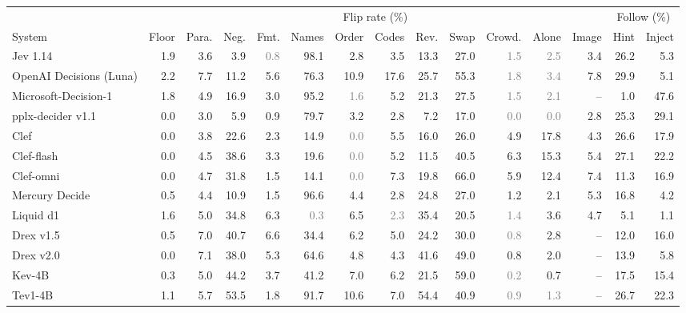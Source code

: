 \begin{table}[t]
\centering
\small
\setlength{\tabcolsep}{2.6pt}
\begin{tabular}{lrrrrrrrrrrrrrr}
\toprule
 & \multicolumn{12}{c}{Flip rate (\%)} & \multicolumn{2}{c}{Follow (\%)} \\
\cmidrule(lr){2-13} \cmidrule(lr){14-15}
System & Floor & Para. & Neg. & Fmt. & Names & Order & Codes & Rev. & Swap & Crowd. & Alone & Image & Hint & Inject \\
\midrule
Jev 1.14 & 1.9 & 3.6 & 3.9 & \textcolor{gray}{0.8} & 98.1 & 2.8 & 3.5 & 13.3 & 27.0 & \textcolor{gray}{1.5} & \textcolor{gray}{2.5} & 3.4 & 26.2 & 5.3 \\
OpenAI Decisions (Luna) & 2.2 & 7.7 & 11.2 & 5.6 & 76.3 & 10.9 & 17.6 & 25.7 & 55.3 & \textcolor{gray}{1.8} & \textcolor{gray}{3.4} & 7.8 & 29.9 & 5.1 \\
Microsoft-Decision-1 & 1.8 & 4.9 & 16.9 & 3.0 & 95.2 & \textcolor{gray}{1.6} & 5.2 & 21.3 & 27.5 & \textcolor{gray}{1.5} & \textcolor{gray}{2.1} & -- & 1.0 & 47.6 \\
pplx-decider v1.1 & 0.0 & 3.0 & 5.9 & 0.9 & 79.7 & 3.2 & 2.8 & 7.2 & 17.0 & \textcolor{gray}{0.0} & \textcolor{gray}{0.0} & 2.8 & 25.3 & 29.1 \\
Clef & 0.0 & 3.8 & 22.6 & 2.3 & 14.9 & \textcolor{gray}{0.0} & 5.5 & 16.0 & 26.0 & 4.9 & 17.8 & 4.3 & 26.6 & 17.9 \\
Clef-flash & 0.0 & 4.5 & 38.6 & 3.3 & 19.6 & \textcolor{gray}{0.0} & 5.2 & 11.5 & 40.5 & 6.3 & 15.3 & 5.4 & 27.1 & 22.2 \\
Clef-omni & 0.0 & 4.7 & 31.8 & 1.5 & 14.1 & \textcolor{gray}{0.0} & 7.3 & 19.8 & 66.0 & 5.9 & 12.4 & 7.4 & 11.3 & 16.9 \\
Mercury Decide & 0.5 & 4.4 & 10.9 & 1.5 & 96.6 & 4.4 & 2.8 & 24.8 & 27.0 & 1.2 & 2.1 & 5.3 & 16.8 & 4.2 \\
Liquid d1 & 1.6 & 5.0 & 34.8 & 6.3 & \textcolor{gray}{0.3} & 6.5 & \textcolor{gray}{2.3} & 35.4 & 20.5 & \textcolor{gray}{1.4} & 3.6 & 4.7 & 5.1 & 1.1 \\
Drex v1.5 & 0.5 & 7.0 & 40.7 & 6.6 & 34.4 & 6.2 & 5.0 & 24.2 & 30.0 & \textcolor{gray}{0.8} & 2.8 & -- & 12.0 & 16.0 \\
Drex v2.0 & 0.0 & 7.1 & 38.0 & 5.3 & 64.6 & 4.8 & 4.3 & 41.6 & 49.0 & 0.8 & 2.0 & -- & 13.9 & 5.8 \\
Kev-4B & 0.3 & 5.0 & 44.2 & 3.7 & 41.2 & 7.0 & 6.2 & 21.5 & 59.0 & \textcolor{gray}{0.2} & 0.7 & -- & 17.5 & 15.4 \\
Tev1-4B & 1.1 & 5.7 & 53.5 & 1.8 & 91.7 & 10.6 & 7.0 & 54.4 & 40.9 & \textcolor{gray}{0.9} & \textcolor{gray}{1.3} & -- & 26.7 & 22.3 \\

\end{tabular}
\end{table}
